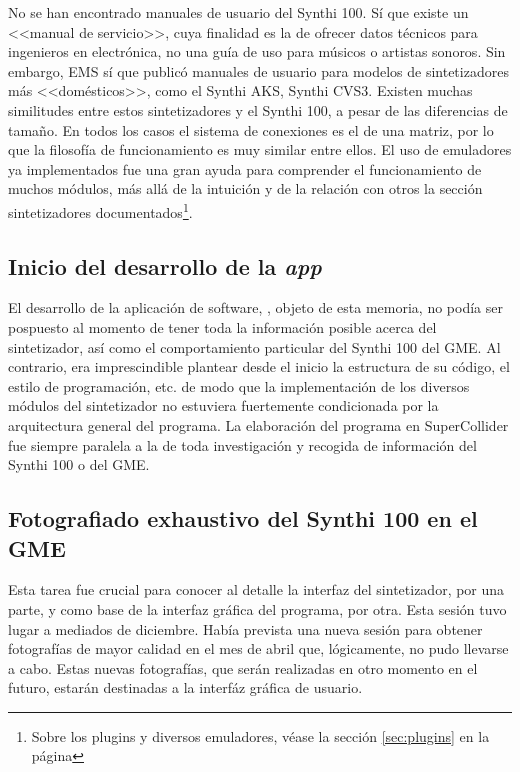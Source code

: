 No se han encontrado manuales de usuario del Synthi 100. Sí que existe un <<manual de servicio>>, cuya finalidad es la de ofrecer datos técnicos para ingenieros en electrónica, no una guía de uso para músicos o artistas sonoros. Sin embargo, EMS sí que publicó manuales de usuario para modelos de sintetizadores más <<domésticos>>, como el Synthi AKS\citeyear{SynthiAKS_brochure}, Synthi CVS3\citeyear{SynthiVCS3_brochure}. Existen muchas similitudes entre estos sintetizadores y el Synthi 100, a pesar de las diferencias de tamaño. En todos los casos el sistema de conexiones es el de una matriz, por lo que la filosofía de funcionamiento es muy similar entre ellos. El uso de emuladores ya implementados fue una gran ayuda para comprender el funcionamiento de muchos módulos, más allá de la intuición y de la relación con otros la sección sintetizadores documentados\footnote{Sobre los plugins y diversos emuladores, véase la sección \ref*{sec:plugins} en la página \pageref{sec:plugins}}.

\subsection{Inicio del desarrollo de la \textit{app}}

El desarrollo de la aplicación de software, \appName, objeto de esta memoria, no podía ser pospuesto al momento de tener toda la información posible acerca del sintetizador, así como el comportamiento particular del Synthi 100 del GME. Al contrario, era imprescindible plantear desde el inicio la estructura de su código, el estilo de programación, etc. de modo que la implementación de los diversos módulos del sintetizador no estuviera fuertemente condicionada por la arquitectura general del programa. La elaboración del programa en SuperCollider fue siempre paralela a la de toda investigación y recogida de información del Synthi 100 o del GME.

\subsection{Fotografiado exhaustivo del Synthi 100 en el GME}

Esta tarea fue crucial para conocer al detalle la interfaz del sintetizador, por una parte, y como base de la interfaz gráfica del programa, por otra. Esta sesión tuvo lugar a mediados de diciembre. Había prevista una nueva sesión para obtener fotografías de mayor calidad en el mes de abril que, lógicamente, no pudo llevarse a cabo. Estas nuevas fotografías, que serán realizadas en otro momento en el futuro, estarán destinadas a la interfáz gráfica de usuario.

